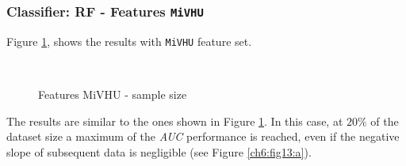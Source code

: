 \subsubsection{Classifier: RF - Features \texttt{MiVHU}}

Figure \ref{ch6:fig13}, shows the results with \texttt{MiVHU} feature set.

\begin{figure}[!htb]
  \centering
    \\
    \caption{Features MiVHU - sample size}
    \label{ch6:fig13}
\end{figure}

\noindent The results are similar to the ones shown in Figure \ref{ch6:fig13}. In this case, at $20\%$ of the dataset size a maximum of the \textit{AUC} performance is reached,
even if the negative slope of subsequent data is negligible (see Figure \ref{ch6:fig13:a}).

